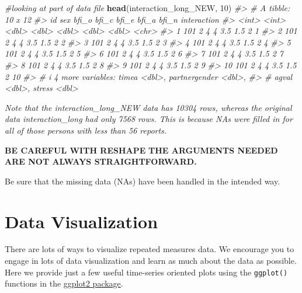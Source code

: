\documentclass[
]{book}
\newenvironment{Shaded}{\begin{snugshade}}{\end{snugshade}}
\newcommand{\CommentTok}[1]{\textcolor[rgb]{0.56,0.35,0.01}{\textit{#1}}}
\newcommand{\DecValTok}[1]{\textcolor[rgb]{0.00,0.00,0.81}{#1}}
\newcommand{\FunctionTok}[1]{\textcolor[rgb]{0.13,0.29,0.53}{\textbf{#1}}}
\newcommand{\NormalTok}[1]{#1}
\theoremstyle{definition}
\theoremstyle{definition}
\theoremstyle{definition}
\theoremstyle{definition}
\theoremstyle{remark}
\begin{document}
\begin{Shaded}
\begin{Highlighting}[]
\CommentTok{\#looking at part of data file}
\FunctionTok{head}\NormalTok{(interaction\_long\_NEW, }\DecValTok{10}\NormalTok{)}
\CommentTok{\#\textgreater{} \# A tibble: 10 x 12}
\CommentTok{\#\textgreater{}       id   sex bfi\_o bfi\_c bfi\_e bfi\_a bfi\_n interaction}
\CommentTok{\#\textgreater{}    \textless{}int\textgreater{} \textless{}int\textgreater{} \textless{}dbl\textgreater{} \textless{}dbl\textgreater{} \textless{}dbl\textgreater{} \textless{}dbl\textgreater{} \textless{}dbl\textgreater{} \textless{}chr\textgreater{}      }
\CommentTok{\#\textgreater{}  1   101     2     4     4   3.5   1.5     2 1          }
\CommentTok{\#\textgreater{}  2   101     2     4     4   3.5   1.5     2 2          }
\CommentTok{\#\textgreater{}  3   101     2     4     4   3.5   1.5     2 3          }
\CommentTok{\#\textgreater{}  4   101     2     4     4   3.5   1.5     2 4          }
\CommentTok{\#\textgreater{}  5   101     2     4     4   3.5   1.5     2 5          }
\CommentTok{\#\textgreater{}  6   101     2     4     4   3.5   1.5     2 6          }
\CommentTok{\#\textgreater{}  7   101     2     4     4   3.5   1.5     2 7          }
\CommentTok{\#\textgreater{}  8   101     2     4     4   3.5   1.5     2 8          }
\CommentTok{\#\textgreater{}  9   101     2     4     4   3.5   1.5     2 9          }
\CommentTok{\#\textgreater{} 10   101     2     4     4   3.5   1.5     2 10         }
\CommentTok{\#\textgreater{} \# i 4 more variables: timea \textless{}dbl\textgreater{}, partnergender \textless{}dbl\textgreater{},}
\CommentTok{\#\textgreater{} \#   agval \textless{}dbl\textgreater{}, stress \textless{}dbl\textgreater{}}
\end{Highlighting}
\end{Shaded}

\emph{Note that the interaction\_long\_NEW data has 10304 rows, whereas the original data interaction\_long had only 7568 rows. This is because NAs were filled in for all of those persons with less than 56 reports.}

\textbf{BE CAREFUL WITH RESHAPE} \textbf{THE ARGUMENTS NEEDED ARE NOT ALWAYS STRAIGHTFORWARD.}

Be sure that the missing data (NAs) have been handled in the intended way.

\section{Data Visualization}\label{data-visualization}

There are lots of ways to visualize repeated measures data.
We encourage you to engage in lots of data visualization and learn as much about the data as possible.
Here we provide just a few useful time-series oriented plots using the \texttt{ggplot()} functions in the \href{https://ggplot2.tidyverse.org/}{ggplot2 package}.
\end{document}
